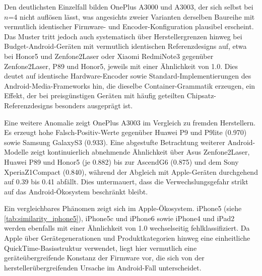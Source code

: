 Den deutlichsten Einzelfall bilden OnePlus A3000 und A3003, der sich selbst bei \(n\)=4 nicht auflösen lässt, was angesichts zweier Varianten derselben Baureihe mit vermutlich identischer Firmware- und Encoder-Konfiguration plausibel erscheint. Das Muster tritt jedoch auch systematisch über Herstellergrenzen hinweg bei Budget-Android-Geräten mit vermutlich identischen Referenzdesigns auf, etwa bei Honor5 und Zenfone2Laser oder Xiaomi RedmiNote3 gegenüber Zenfone2Laser, P89 und Honor5, jeweils mit einer Ähnlichkeit von 1.0. Dies deutet auf identische Hardware-Encoder sowie Standard-Implementierungen des Android-Media-Frameworks hin, die dieselbe Container-Grammatik erzeugen, ein Effekt, der bei preisgünstigen Geräten mit häufig geteilten Chipsatz-Referenzdesigns besonders ausgeprägt ist.

Eine weitere Anomalie zeigt OnePlus A3003 im Vergleich zu fremden Herstellern. Es erzeugt hohe Falsch-Positiv-Werte gegenüber Huawei P9 und P9lite (0.970) sowie Samsung GalaxyS3 (0.933). Eine abgestufte Betrachtung weiterer Android-Modelle zeigt kontinuierlich abnehmende Ähnlichkeit über Asus Zenfone2Laser, Huawei P89 und Honor5 (je 0.882) bis zur AscendG6 (0.875) und dem Sony XperiaZ1Compact (0.840), während der Abgleich mit Apple-Geräten durchgehend auf 0.39 bis 0.41 abfällt. Dies untermauert, dass die Verwechslungsgefahr strikt auf das Android-Ökosystem beschränkt bleibt.

Ein vergleichbares Phänomen zeigt sich im Apple-Ökosystem. iPhone5 (siehe \cref{tab:similarity_iphone5}), iPhone5c und iPhone6 sowie iPhone4 und iPad2 werden ebenfalls mit einer Ähnlichkeit von 1.0 wechselseitig fehlklassifiziert. Da Apple über Gerätegenerationen und Produktkategorien hinweg eine einheitliche QuickTime-Basisstruktur verwendet, liegt hier vermutlich eine geräteübergreifende Konstanz der Firmware vor, die sich von der herstellerübergreifenden Ursache im Android-Fall unterscheidet.

